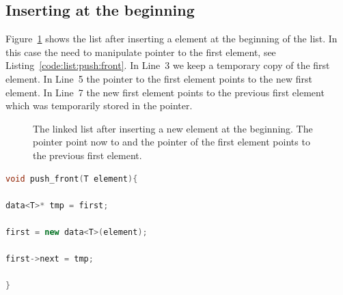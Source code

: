 \documentclass[11pt,fleqn]{book} %
\begin{document}
\subsection*{Inserting at the beginning}

Figure~\ref{fig:sketch:linked:list:push_front} shows the list after inserting a element at the beginning of the list. In this case the need to manipulate pointer  to the first element, see Listing~\ref{code:list:push:front}. In Line~3 we keep a temporary copy  of the first element. In Line~5 the pointer to the first element points to the new first element. In Line~7 the new first element points to the previous first element which was temporarily stored in the  pointer.


\begin{figure}[h]
\centering
{}
\caption{The linked list after inserting a new element at the beginning. The pointer  point now to  and the pointer  of the first element points to the previous first element.}
\label{fig:sketch:linked:list:push_front}
\end{figure}

\begin{lstlisting}[language=c++,caption={Implementation of the \cpp{push_back} function of a linked list.\label{code:list:push:front}},float,floatplacement=tb]
void push_front(T element){
    
data<T>* tmp = first;
    
first = new data<T>(element);
    
first->next = tmp; 
    
}
\end{lstlisting}

\end{document}
